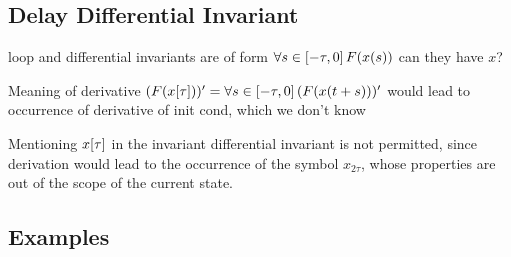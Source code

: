 \documentclass[10pt]{report}
\begin{document}
        \subsection{Delay Differential Invariant}
            \label{sec:delay-differential-invariant}



            loop and differential invariants are of form $\forall s\in[-\tau,0]{\,} F(x(s))$
            can they have $x$?

            Meaning of derivative $(F(x[\tau]))'=\forall s\in[-\tau,0]{\,} (F(x(t+s)))'$ would lead to occurrence of derivative of init cond, which we don't know

            Mentioning $x[\tau]$ in the invariant differential invariant is not permitted, since derivation would lead to the occurrence of the symbol $x_{2\tau}$, whose properties are out of the scope of the current state.

        \subsection{Examples}
            \label{sec:examples}
\end{document}
